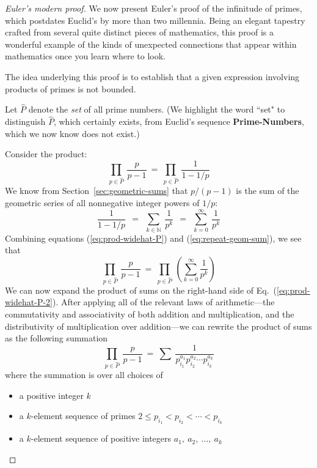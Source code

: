 \begin{proof} [Euler's modern proof]
We now present Euler's proof of the infinitude of primes, which postdates Euclid's by more than two millennia.  Being an elegant tapestry crafted from several quite distinct pieces of mathematics, this proof is a wonderful example of the kinds of unexpected connections that appear within mathematics once you learn where to look.

\medskip

The idea underlying this proof is to establish that a given expression involving products of primes is not bounded.

\smallskip

Let $\widehat{P}$ denote the {\em set} of all prime numbers.  (We highlight the word ``set" to distinguish $\widehat{P}$, which certainly exists, from Euclid's sequence {\bf Prime-Numbers}, which we now know does not exist.)

\smallskip

Consider the product:
\begin{equation}
\label{eq:prod-widehat-P}
 \prod_{p \in \widehat{P}} \ \frac{p}{p-1} \ = \ \prod_{p \in \widehat{P}} \ \frac{1}{1-1/p} 
\end{equation}
We know from Section~\ref{sec:geometric-sums} that $p/(p-1)$ is the sum of the geometric series of all nonnegative integer powers of $1/p$: 
\begin{equation}
\label{eq:repeat-geom-sum}
\frac{1}{1-1/p} \ \ = \ \
\sum_{k \in {\mathbb{N}}} \  \frac{1}{p^k} \ \ = \ \
\sum_{k=0}^{\infty} \  \frac{1}{p^k} 
\end{equation}
Combining equations (\ref{eq:prod-widehat-P}) and (\ref{eq:repeat-geom-sum}), we see that
\begin{equation}
\label{eq:prod-widehat-P-2}
\prod_{p \in \widehat{P}} \ \frac{p}{p-1} \ = \
 \prod_{p \in \widehat{P}} \ \left( \sum_{k=0}^{\infty} \frac{1}{p^k} \right)
\end{equation}
We can now expand the product of sums on the right-hand side of 
Eq.~(\ref{eq:prod-widehat-P-2}).  After applying all of the relevant laws of arithmetic---the commutativity and associativity of both addition and multiplication, and the distributivity of multiplication over addition---we can rewrite the product of sums as the following summation
\begin{equation}
\label{eq:prod-widehat-P-3}
 \prod_{p \in \widehat{P}} \ \frac{p}{p-1} \ = \
\sum \ \frac{1}{p_{i_1}^{a_1} p_{i_2}^{a_2} \cdots p_{i_k}^{a_k}}
\end{equation}
where the summation is over all choices of
\begin{itemize}
\item
a positive integer $k$
\item
a $k$-element sequence of primes $2 \leq p_{i_1} < p_{i_2} < \cdots < p_{i_k}$
\item
a $k$-element sequence of positive integers $a_1, \ a_2, \ \ldots,  \ a_k$
\end{itemize}


\end{proof}
